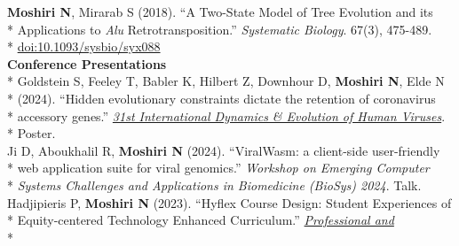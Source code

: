 \documentclass[margin,line]{res}
\begin{document}
\begin{resume}
\hspace*{4mm} \textbf{Moshiri N}, Mirarab S (2018). ``A Two-State Model of Tree Evolution and its\\*
\hspace*{9mm} Applications to \textit{Alu} Retrotransposition.'' \textit{Systematic Biology}. 67(3), 475-489.\\*\vspace{2mm}
\hspace*{8mm} \href{https://doi.org/10.1093/sysbio/syx088}{doi:10.1093/sysbio/syx088}
~\\
\textbf{Conference Presentations}\vspace{2mm}\\*
\hspace*{4mm} Goldstein S, Feeley T, Babler K, Hilbert Z, Downhour D, \textbf{Moshiri N}, Elde N\\*
\hspace*{9mm} (2024). ``Hidden evolutionary constraints dictate the retention of coronavirus\\*
\hspace*{9mm} accessory genes.'' \href{https://cpd.ucsd.edu/hivdynamics/}{\textit{31st International Dynamics \& Evolution of Human Viruses}}.\\*\vspace{2mm}
\hspace*{8mm} Poster.\\
\hspace*{4mm} Ji D, Aboukhalil R, \textbf{Moshiri N} (2024). ``ViralWasm: a client-side user-friendly\\*
\hspace*{9mm} web application suite for viral genomics.'' \textit{Workshop on Emerging Computer}\\*\vspace{2mm}
\hspace*{8mm} \textit{Systems Challenges and Applications in Biomedicine (BioSys) 2024}. Talk.\\
\hspace*{4mm} Hadjipieris P, \textbf{Moshiri N} (2023). ``Hyflex Course Design: Student Experiences of\\*
\hspace*{9mm} Equity-centered Technology Enhanced Curriculum.'' \href{https://podnetwork.org/48th-annual-conference/}{\textit{Professional and}}\\*\vspace{2mm}

\end{resume}
\end{document}
